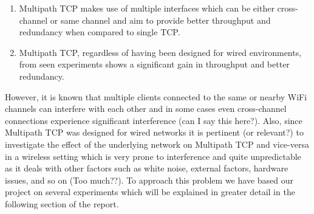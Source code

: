 \begin{enumerate}
  \item Multipath TCP makes use of multiple interfaces which can be either
    cross-channel or same channel and aim to provide better throughput and
    redundancy when compared to single TCP.
  \item Multipath TCP, regardless of having been designed for wired
    environments, from seen experiments shows a significant gain in throughput
    and better redundancy.
\end{enumerate}

However, it is known that multiple clients connected to the same or nearby WiFi
channels can interfere with each other and in some cases even cross-channel
connections experience significant interference (can I say this here?). Also,
since Multipath TCP was designed for wired networks it is pertinent (or
relevant?) to investigate the effect of the underlying network on Multipath TCP
and vice-versa in a wireless setting which is very prone to interference and
quite unpredictable as it deals with other factors such as white noise, external
factors, hardware issues, and so on (Too much??).  To approach this problem we
have based our project on several experiments which will be explained in greater
detail in the following section of the report.
